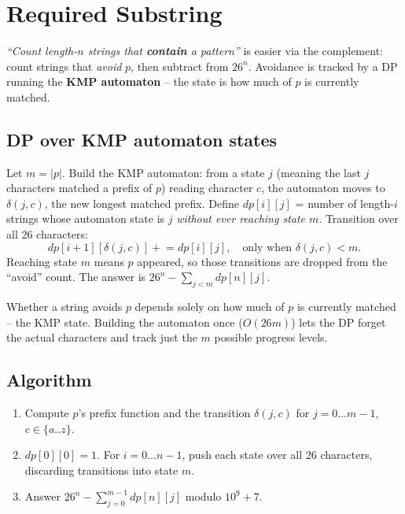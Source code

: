 \section{Required Substring}
\label{sec:cses-required-substring}


\begin{patternbox}
\emph{``Count length-$n$ strings that \textbf{contain} a pattern''} is
easier via the complement: count strings that \emph{avoid} $p$, then
subtract from $26^n$. Avoidance is tracked by a DP running the
\textbf{KMP automaton} -- the state is how much of $p$ is currently
matched.
\end{patternbox}

\subsection*{DP over KMP automaton states}

Let $m=|p|$. Build the KMP automaton: from a state $j$ (meaning the last
$j$ characters matched a prefix of $p$) reading character $c$, the
automaton moves to $\delta(j,c)$, the new longest matched prefix. Define
$\textit{dp}[i][j]$ = number of length-$i$ strings whose automaton state is
$j$ \emph{without ever reaching state $m$}. Transition over all 26
characters:
\[
  \textit{dp}[i+1][\delta(j,c)]\mathrel{+}=\textit{dp}[i][j],\quad
  \text{only when }\delta(j,c)<m.
\]
Reaching state $m$ means $p$ appeared, so those transitions are dropped
from the ``avoid'' count. The answer is
$26^n-\sum_{j<m}\textit{dp}[n][j]$.

\begin{ideabox}
Whether a string avoids $p$ depends solely on how much of $p$ is currently
matched -- the KMP state. Building the automaton once ($O(26m)$) lets the
DP forget the actual characters and track just the $m$ possible progress
levels.
\end{ideabox}

\subsection*{Algorithm}

\begin{enumerate}
  \item Compute $p$'s prefix function and the transition $\delta(j,c)$
        for $j=0\ldots m-1$, $c\in\{a..z\}$.
  \item $\textit{dp}[0][0]=1$. For $i=0\ldots n-1$, push each state over
        all 26 characters, discarding transitions into state $m$.
  \item Answer $26^n-\sum_{j=0}^{m-1}\textit{dp}[n][j]$ modulo $10^9+7$.
\end{enumerate}

